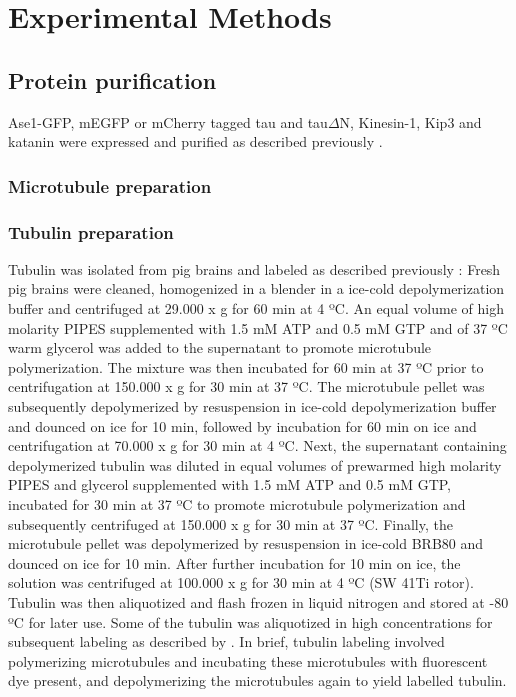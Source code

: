 \chapter{Experimental Methods}
\label{methods}
\section{Protein purification} 
Ase1-GFP, mEGFP or mCherry tagged tau and tau$\Delta$N, Kinesin-1, Kip3 and katanin were expressed and purified as described previously \parencite{HERNANDEZVEGA20172304,Herrmann2018,Mitra2018,NITZSCHE2010247, Janson2007}.

\subsection{Microtubule preparation}
\subsection{Tubulin preparation}
Tubulin was isolated from pig brains and labeled as described previously \parencite{CASTOLDI200383}: Fresh pig brains were cleaned, homogenized in a blender in a ice-cold depolymerization buffer and centrifuged at 29.000 x g for
60 min at 4 ºC. An equal volume of high molarity PIPES supplemented with 1.5 mM ATP and 0.5 mM GTP and of 37 ºC warm glycerol was added to the supernatant to promote microtubule polymerization. The mixture was then incubated for 60 min at 37 ºC prior to centrifugation at 150.000 x g for 30 min at 37 ºC. The microtubule pellet was subsequently depolymerized by resuspension in ice-cold depolymerization buffer and dounced on ice for 10 min, followed by
incubation for 60 min on ice and centrifugation at 70.000 x g for 30 min at 4 ºC. Next, the supernatant containing depolymerized tubulin was diluted in equal
volumes of prewarmed high molarity PIPES and glycerol supplemented with 1.5 mM
ATP and 0.5 mM GTP, incubated for 30 min at 37 ºC to promote microtubule polymerization and subsequently centrifuged at 150.000 x g for 30 min at 37 ºC.
Finally, the microtubule pellet was depolymerized by resuspension in ice-cold BRB80
and dounced on ice for 10 min. After further incubation for 10 min on ice, the solution
was centrifuged at 100.000 x g for 30 min at 4 ºC (SW 41Ti rotor). Tubulin was then aliquotized and flash frozen in liquid nitrogen and stored at -80 ºC for later use. Some of the tubulin was aliquotized in high concentrations for subsequent labeling as described by \cite{HYMAN1991478}. In brief, tubulin labeling involved polymerizing microtubules and incubating these microtubules with fluorescent dye present, and depolymerizing the microtubules again to yield labelled tubulin.
